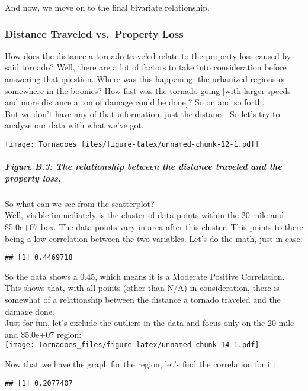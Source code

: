 \documentclass[
]{article}
\begin{document}
And now, we move on to the final bivariate relationship.

\subsubsection{Distance Traveled vs.~Property
Loss}\label{distance-traveled-vs.-property-loss}

How does the distance a tornado traveled relate to the property loss
caused by said tornado? Well, there are a lot of factors to take into
consideration before answering that question. Where was this happening:
the urbanized regions or somewhere in the boonies? How fast was the
tornado going {[}with larger speeds and more distance a ton of damage
could be done{]}? So on and so forth.\\
But we don't have any of that information, just the distance. So let's
try to analyze our data with what we've got.

\texttt{[image: Tornadoes\_files/figure-latex/unnamed-chunk-12-1.pdf]}

\subparagraph{Figure B.3: The relationship between the distance traveled
and the property
loss.}\label{figure-b.3-the-relationship-between-the-distance-traveled-and-the-property-loss.}

So what can we see from the scatterplot?\\
Well, visible immediately is the cluster of data points within the 20
mile and \$5.0e+07 box. The data points vary in area after this cluster.
This points to there being a low correlation between the two variables.
Let's do the math, just in case:

\begin{verbatim}
## [1] 0.4469718
\end{verbatim}

So the data shows a 0.45, which means it is a Moderate Positive
Correlation. This shows that, with all points (other than N/A) in
consideration, there is somewhat of a relationship between the distance
a tornado traveled and the damage done.\\
Just for fun, let's exclude the outliers in the data and focus only on
the 20 mile and \$5.0e+07 region:\\
\texttt{[image: Tornadoes\_files/figure-latex/unnamed-chunk-14-1.pdf]}

Now that we have the graph for the region, let's find the correlation
for it:

\begin{verbatim}
## [1] 0.2077407
\end{verbatim}
\end{document}
